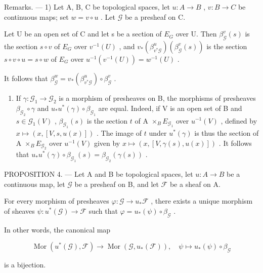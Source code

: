 Remarks. --- 1) Let A, B, C be topological spaces, let \(u\colon A \to B\) , \(v\colon B \to C\) be continuous maps; set \(w = v \circ u\) . Let \(\mathcal{G}\) be a presheaf on C.

Let U be an open set of C and let s be a section of \(E_{G}\) over U. Then \(\beta_{\mathcal{G}}^{v}(s)\) is the section \(s \circ v\) of \(E_{G}\) over \(v^{-1}(U)\) , and \(v_{*}(\beta_{v^{*}\mathcal{G}}^{u})(\beta_{\mathcal{G}}^{v}(s))\) is the section \(s \circ v \circ u = s \circ w\) of \(E_{G}\) over \(u^{-1}(v^{-1}(U)) = w^{-1}(U)\) .

It follows that \(\beta_{\mathcal{G}}^{w} = v_{*}(\beta_{v^{*}\mathcal{G}}^{u})\circ \beta_{\mathcal{G}}^{v}\) .

\begin{enumerate}
\def\labelenumi{\arabic{enumi})}
\setcounter{enumi}{1}
\tightlist
\item
  If \(\gamma\colon\mathcal{G}_{1}\to\mathcal{G}_{2}\) is a morphism of presheaves on B, the morphisms of presheaves \(\beta_{\mathcal{G}_{2}}\circ\gamma\) and \(u_{*}u^{*}(\gamma)\circ\beta_{\mathcal{G}_{1}}\) are equal. Indeed, if V is an open set of B and \(s\in\mathcal{G}_{1}(V)\) , \(\beta_{\mathcal{G}_{1}}(s)\) is the section \(t\) of A \(\times_{B}E_{\mathcal{G}_{1}}\) over \(u^{-1}(V)\) , defined by \(x\mapsto(x,[V,s,u(x)])\) . The image of \(t\) under \(u^{*}(\gamma)\) is thus the section of A \(\times_{B}E_{\mathcal{G}_{2}}\) over \(u^{-1}(V)\) given by \(x\mapsto(x,[V,\gamma(s),u(x)])\) . It follows that \(u_{*}u^{*}(\gamma)\circ\beta_{\mathcal{G}_{1}}(s)=\beta_{\mathcal{G}_{2}}(\gamma(s))\) .
\end{enumerate}

PROPOSITION 4. --- Let A and B be topological spaces, let \(u\colon A\to B\) be a continuous map, let \(\mathcal{G}\) be a presheaf on B, and let \(\mathcal{F}\) be a sheaf on A.

For every morphism of presheaves \(\varphi\colon\mathcal{G}\to u_{*}\mathcal{F}\) , there exists a unique morphism of sheaves \(\psi\colon u^{*}(\mathcal{G})\to\mathcal{F}\) such that \(\varphi=u_{*}(\psi)\circ\beta_{\mathcal{G}}\) .

In other words, the canonical map

\[
\operatorname{Mor} \left(u ^ {*} (\mathcal {G}), \mathcal {F}\right)\rightarrow \operatorname{Mor} \left(\mathcal {G}, u _ {*} (\mathcal {F})\right), \quad \psi \mapsto u _ {*} (\psi) \circ \beta_ {\mathcal {G}}
\]

is a bijection.

